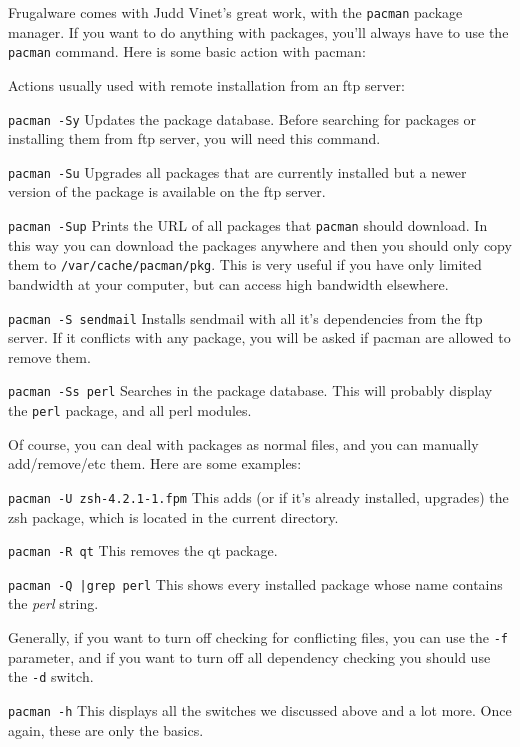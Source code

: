 Frugalware comes with Judd Vinet's great work, with the {\tt pacman} package manager. If you want to do anything with packages, you'll always have to use the {\tt pacman} command. Here is some basic action with pacman:

Actions usually used with remote installation from an ftp server:

{\tt pacman -Sy} Updates the package database. Before searching for packages or installing them from ftp server, you will need this command.

{\tt pacman -Su} Upgrades all packages that are currently installed but a newer version of the package is available on the ftp server.

{\tt pacman -Sup} Prints the URL of all packages that {\tt pacman} should download. In this way you can download the packages anywhere and then you should only copy them to {\tt /var/cache/pacman/pkg}. This is very useful if you have only limited bandwidth at your computer, but can access high bandwidth elsewhere.

{\tt pacman -S sendmail} Installs sendmail with all it's dependencies from the ftp server. If it conflicts with any package, you will be asked if pacman are allowed to remove them.

{\tt pacman -Ss perl} Searches in the package database. This will probably display the {\tt perl} package, and all perl modules.

Of course, you can deal with packages as normal files, and you can manually add/remove/etc them. Here are some examples:

{\tt pacman -U zsh-4.2.1-1.fpm} This adds (or if it's already installed, upgrades) the zsh package, which is located in the current directory.

{\tt pacman -R qt} This removes the qt package.

{\tt pacman -Q |grep perl} This shows every installed package whose name contains the \textit{perl} string.

Generally, if you want to turn off checking for conflicting files, you can use the {\tt -f} parameter, and if you want to turn off all dependency checking you should use the {\tt -d} switch.

{\tt pacman -h} This displays all the switches we discussed above and a lot more. Once again, these are only the basics.

